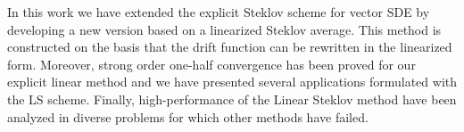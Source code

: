 In this work we have extended the explicit Steklov scheme for 
vector SDE by developing a new version  based on a 
linearized Steklov average. This method is 
constructed on the basis that the drift function 
can be rewritten  in the linearized form. 
Moreover, strong order one-half convergence has been proved for our explicit 
linear method and we have presented  several applications formulated 
with the LS scheme. Finally, high-performance of the Linear Steklov 
method  have been analyzed in diverse problems for which other methods 
have failed.



% 
